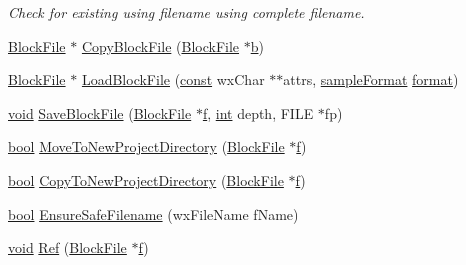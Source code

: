 \begin{DoxyCompactItemize}
\begin{DoxyCompactList}\small\item\em Check for existing using filename using complete filename. \end{DoxyCompactList}\item 
\hyperlink{class_block_file}{Block\+File} $\ast$ \hyperlink{class_dir_manager_adb7d04370b8fee46d6c47c3dc39f8e93}{Copy\+Block\+File} (\hyperlink{class_block_file}{Block\+File} $\ast$\hyperlink{convtest_8m_a21ad0bd836b90d08f4cf640b4c298e7c}{b})
\item 
\hyperlink{class_block_file}{Block\+File} $\ast$ \hyperlink{class_dir_manager_a59e38805eb663a7eac3a5d38c671869d}{Load\+Block\+File} (\hyperlink{getopt1_8c_a2c212835823e3c54a8ab6d95c652660e}{const} wx\+Char $\ast$$\ast$attrs, \hyperlink{include_2audacity_2_types_8h_a9938d2e2f6adef23e745cd80ef379792}{sample\+Format} \hyperlink{_export_p_c_m_8cpp_a317afff57d87a89158c2b038d37b2b08}{format})
\item 
\hyperlink{sound_8c_ae35f5844602719cf66324f4de2a658b3}{void} \hyperlink{class_dir_manager_af491dc8a2e4c15de54e7e13c18c96cb0}{Save\+Block\+File} (\hyperlink{class_block_file}{Block\+File} $\ast$\hyperlink{checksum_8c_ae747d72a1a803f5ff4a4b2602857d93b}{f}, \hyperlink{xmltok_8h_a5a0d4a5641ce434f1d23533f2b2e6653}{int} depth, F\+I\+LE $\ast$fp)
\item 
\hyperlink{mac_2config_2i386_2lib-src_2libsoxr_2soxr-config_8h_abb452686968e48b67397da5f97445f5b}{bool} \hyperlink{class_dir_manager_a8a30866c77bc0a95595885971faea5aa}{Move\+To\+New\+Project\+Directory} (\hyperlink{class_block_file}{Block\+File} $\ast$\hyperlink{checksum_8c_ae747d72a1a803f5ff4a4b2602857d93b}{f})
\item 
\hyperlink{mac_2config_2i386_2lib-src_2libsoxr_2soxr-config_8h_abb452686968e48b67397da5f97445f5b}{bool} \hyperlink{class_dir_manager_ae316c89cbf2ce08413250c787b9c73a4}{Copy\+To\+New\+Project\+Directory} (\hyperlink{class_block_file}{Block\+File} $\ast$\hyperlink{checksum_8c_ae747d72a1a803f5ff4a4b2602857d93b}{f})
\item 
\hyperlink{mac_2config_2i386_2lib-src_2libsoxr_2soxr-config_8h_abb452686968e48b67397da5f97445f5b}{bool} \hyperlink{class_dir_manager_a55d678c4bb441f283408608c1b8e91a7}{Ensure\+Safe\+Filename} (wx\+File\+Name f\+Name)
\item 
\hyperlink{sound_8c_ae35f5844602719cf66324f4de2a658b3}{void} \hyperlink{class_dir_manager_aad42c35b1e32721c53bba75628bc1b6f}{Ref} (\hyperlink{class_block_file}{Block\+File} $\ast$\hyperlink{checksum_8c_ae747d72a1a803f5ff4a4b2602857d93b}{f})
$$
\end{DoxyCompactItemize}
